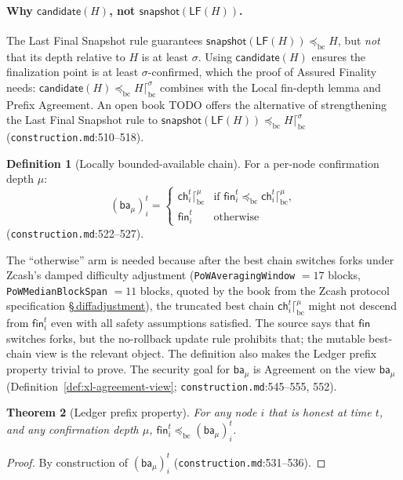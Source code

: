 \documentclass[11pt,a4paper]{article}
\newtheorem{theorem}{Theorem}[section]
\theoremstyle{definition}
\newtheorem{definition}[theorem]{Definition}
\begin{document}
\paragraph{Why $\mathsf{candidate}(H)$, not
$\mathsf{snapshot}(\mathsf{LF}(H))$.} The Last Final Snapshot rule
guarantees $\mathsf{snapshot}(\mathsf{LF}(H))\allowbreak
\preceq_{\mathrm{bc}} H$,
but \emph{not} that its depth relative to $H$ is at least $\sigma$. Using
$\mathsf{candidate}(H)$ ensures the finalization point is at least
$\sigma$-confirmed, which the proof of Assured Finality needs:
$\mathsf{candidate}(H) \preceq_{\mathrm{bc}} H
\lceil^{\sigma}_{\mathrm{bc}}$ combines with the Local fin-depth lemma
and Prefix Agreement. An open book TODO offers the alternative of
strengthening the Last Final Snapshot rule to
$\mathsf{snapshot}(\mathsf{LF}(H)) \preceq_{\mathrm{bc}} H
\lceil^{\sigma}_{\mathrm{bc}}$ (\texttt{construction.md}:510--518).

\begin{definition}[Locally bounded-available chain]\label{def:xl-ba}
For a per-node confirmation depth $\mu$:
\[
(\mathsf{ba}_{\mu})_i^t =
\begin{cases}
\mathsf{ch}_i^t \lceil^{\mu}_{\mathrm{bc}} &
  \text{if } \mathsf{fin}_i^t \preceq_{\mathrm{bc}} \mathsf{ch}_i^t
  \lceil^{\mu}_{\mathrm{bc}},\\
\mathsf{fin}_i^t & \text{otherwise}
\end{cases}
\]
(\texttt{construction.md}:522--527).
\end{definition}

The ``otherwise'' arm is needed because after the best chain switches
forks under Zcash's damped difficulty adjustment
(\texttt{PoWAveragingWindow} $= 17$ blocks, \texttt{PoWMedianBlockSpan}
$= 11$ blocks, quoted by the book from the Zcash protocol specification
\href{https://zips.z.cash/protocol/protocol.pdf\#diffadjustment}{\S\,diffadjustment}), the truncated best chain $\mathsf{ch}_i^t
\lceil^{\mu}_{\mathrm{bc}}$ might not descend from $\mathsf{fin}_i^t$
even with all safety assumptions satisfied. The source says that
$\mathsf{fin}$ switches forks, but the no-rollback update rule prohibits
that; the mutable best-chain view is the relevant object. The definition also makes the
Ledger prefix property trivial to prove. The security goal for
$\mathsf{ba}_{\mu}$ is Agreement on the view $\mathsf{ba}_{\mu}$
(Definition~\ref{def:xl-agreement-view};
\texttt{construction.md}:545--555, 552).

\begin{theorem}[Ledger prefix property]\label{thm:xl-ledger-prefix}
For any node $i$ that is honest at time $t$, and any confirmation depth
$\mu$, $\mathsf{fin}_i^t \preceq_{\mathrm{bc}} (\mathsf{ba}_{\mu})_i^t$.
\end{theorem}
\begin{proof}
By construction of $(\mathsf{ba}_{\mu})_i^t$
(\texttt{construction.md}:531--536).
\end{proof}
\end{document}
